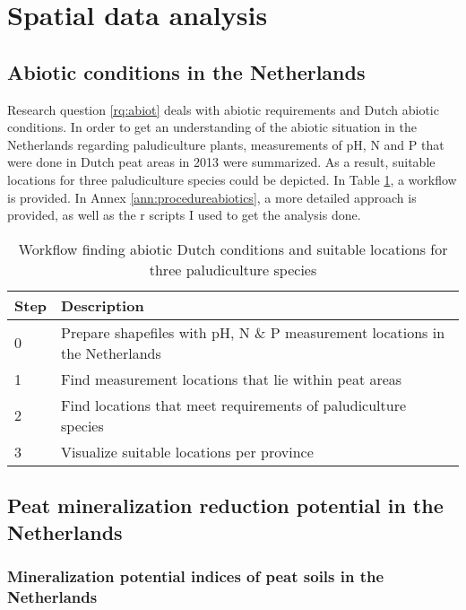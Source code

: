\documentclass[a4paper,12pt]{scrbook}
\begin{document}
\section{Spatial data analysis}

\subsection{Abiotic conditions in the Netherlands}
Research question \ref{rq:abiot} deals with abiotic requirements and Dutch abiotic conditions. 
In order to get an understanding of the abiotic situation in the Netherlands regarding paludiculture plants, measurements of pH, \ac{N} and \ac{P} that were done in Dutch peat areas in 2013 were summarized. As a result, suitable locations for three paludiculture species could be depicted. In Table \ref{tab:workflowabiotic}, a workflow is provided. In Annex \ref{ann:procedureabiotics}, a more detailed approach is provided, as well as the r scripts I used to get the analysis done.

\begin{table}[htbp]
\caption{Workflow finding abiotic Dutch conditions and suitable locations for three paludiculture species}
\begin{center}
\begin{tabular}{|p{3cm}|p{10cm}|}
\hline
\multicolumn{1}{|l|}{\textbf{Step}} & \textbf{Description} \\ \hline
0 & Prepare shapefiles with pH, N \& P measurement locations in the Netherlands \\ \hline
1 & Find measurement locations that lie within peat areas \\ \hline
2 & Find locations that meet requirements of paludiculture species \\ \hline
3 & Visualize suitable locations per province \\ \hline
\end{tabular}
\end{center}
\label{tab:workflowabiotic}
\end{table}


\subsection{Peat mineralization reduction potential in the Netherlands}

\subsubsection{Mineralization potential indices of peat soils in the Netherlands} \label{sec:mineralpotmet}
\end{document}
